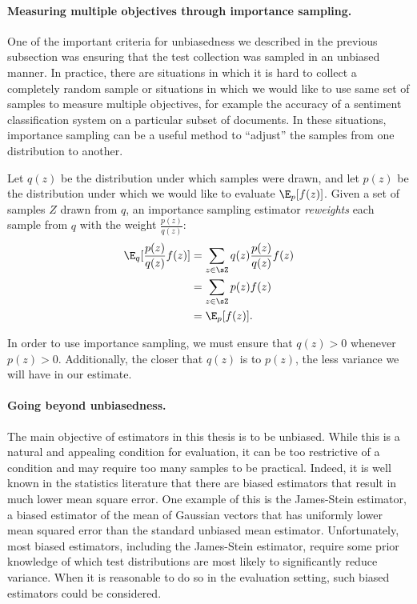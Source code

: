 \paragraph{Measuring multiple objectives through importance sampling.}
One of the important criteria for unbiasedness we described in the previous subsection was ensuring that the test collection was sampled in an unbiased manner.
In practice, there are situations in which it is hard to collect a completely random sample or situations in which we would like to use same set of samples to measure multiple objectives, for example the accuracy of a sentiment classification system on a particular subset of documents.
In these situations, importance sampling can be a useful method to ``adjust'' the samples from one distribution to another.

Let $q(z)$ be the distribution under which samples were drawn, and let $p(z)$ be the distribution under which we would like to evaluate $\E_p[f(z)]$.
Given a set of samples $Z$ drawn from $q$, an importance sampling estimator \textit{reweights} each sample from $q$ with the weight $\frac{p(z)}{q(z)}$:
\begin{align}
  \E_q[\frac{p(z)}{q(z)} f(z)] 
  &= \sum_{z \in \sZ} q(z) \frac{p(z)}{q(z)} f(z) \\
  &= \sum_{z \in \sZ} p(z) f(z) \\
  &= \E_p[f(z)].
\end{align}

In order to use importance sampling, we must ensure that $q(z) > 0$ whenever $p(z) > 0$.
Additionally, the closer that $q(z)$ is to $p(z)$, the less variance we will have in our estimate.

\paragraph{Going beyond unbiasedness.}
The main objective of estimators in this thesis is to be unbiased.
While this is a natural and appealing condition for evaluation, it can be too restrictive of a condition and may require too many samples to be practical.
Indeed, it is well known in the statistics literature that there are biased estimators that result in much lower mean square error.
One example of this is the James-Stein estimator, a biased estimator of the mean of Gaussian vectors that has uniformly lower mean squared error than the standard unbiased mean estimator.
Unfortunately, most biased estimators, including the James-Stein estimator, require some prior knowledge of which test distributions are most likely to significantly reduce variance.
When it is reasonable to do so in the evaluation setting, such biased estimators could be considered.
